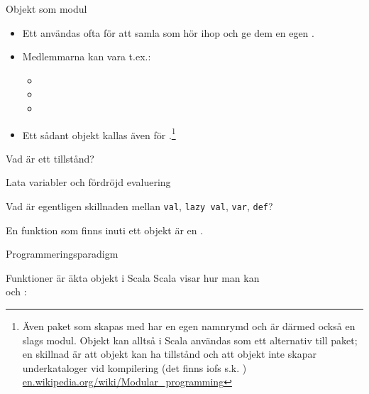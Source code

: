 
\begin{Slide}{Objekt som modul}
\begin{itemize}
\item Ett  användas ofta för att samla  som hör ihop och ge dem en egen . 
\item Medlemmarna kan vara t.ex.: 
\begin{itemize}
\item  {} \item {} \item {} 
\end{itemize}
\item Ett sådant objekt kallas även för .\footnote{
Även paket som skapas med  har en egen namnrymd och är därmed också en slags modul. Objekt kan alltså i Scala användas som ett alternativ till paket; en skillnad är att objekt kan ha tillstånd och att objekt inte skapar underkataloger vid kompilering (det finns iofs s.k. ) \href{https://en.wikipedia.org/wiki/Modular_programming}{en.wikipedia.org/wiki/Modular\_programming}}

\end{itemize}

\end{Slide}


\begin{Slide}{Vad är ett tillstånd?} 
\end{Slide} 

\begin{Slide}{Lata variabler och fördröjd evaluering} 
\end{Slide} 

\begin{Slide}{Vad är egentligen skillnaden mellan \texttt{val}, \texttt{lazy val}, \texttt{var}, \texttt{def}?} 

En funktion som finns inuti ett objekt är en .
\end{Slide} 



\begin{Slide}{Programmeringsparadigm}
\end{Slide} 


\begin{Slide}{Funktioner är äkta objekt i Scala}
Scala visar hur man kan   \\  och : \\\vspace{2em}


\end{Slide} 



